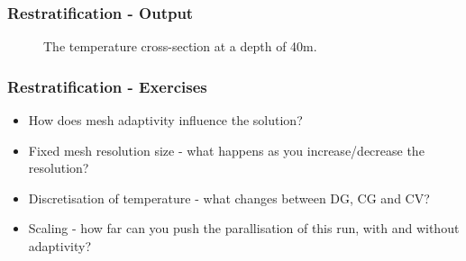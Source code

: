 \begin{frame}
    \frametitle{Restratification - Output}
\begin{figure}
\begin{center}
\hspace{1cm}

\hspace{1cm}
\caption{The temperature cross-section at a depth of 40m.}
\label{fig:rousset-40m}
\end{center}
\end{figure}\end{frame}

\begin{frame}
  \frametitle{Restratification - Exercises}
\begin{itemize}
\item How does mesh adaptivity influence the solution?
\item Fixed mesh resolution size - what happens as you increase/decrease the resolution?
\item Discretisation of temperature - what changes between DG, CG and CV?
\item Scaling - how far can you push the parallisation of this run, with and without adaptivity?
\end{itemize}
\end{frame}






